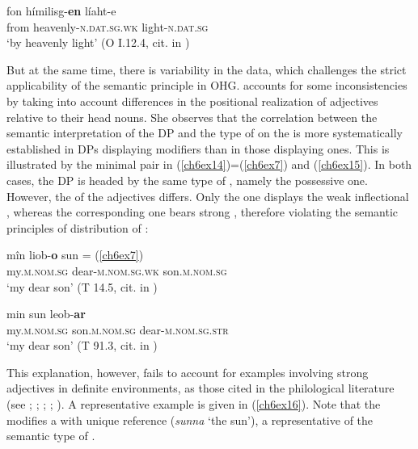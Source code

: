 \documentclass[output=paper,colorlinks,citecolor=brown]{langscibook}
\begin{document}
\begin{exe}
\ex\label{ch6ex13}
\gll fon hímilisg-\textbf{en} líaht-e\\
from heavenly-\textsc{n.dat.sg.wk} light-\textsc{n.dat.sg}\\
\glt `by heavenly light' (O I.12.4, cit. in \cite[67, ex. (45a)]{Demske01})
\end{exe}

But at the same time, there is variability in the data, which challenges
the strict applicability of the semantic principle in OHG. \citet[70]{Demske01} accounts for some inconsistencies by taking into account differences
in the positional realization of adjectives relative to their head
nouns. She observes that the correlation between the semantic
interpretation of the DP and the type of  on the  is
more systematically established in DPs displaying  modifiers
than in those displaying  ones. This is illustrated by the
minimal pair in (\ref{ch6ex14})=(\ref{ch6ex7}) and (\ref{ch6ex15}). In both cases, the DP is headed by
the same type of , namely the possessive one. However, the
 of the adjectives differs. Only the  one displays
the weak inflectional , whereas the corresponding  one
bears strong , therefore violating the semantic principles of
distribution of :

\begin{exe}
\ex\label{ch6ex14}
\gll mîn liob-\textbf{o} sun = (\ref{ch6ex7})\\
 my.\textsc{m.nom.sg} dear-\textsc{m.nom.sg.wk} son.\textsc{m.nom.sg}\\
\glt  `my dear son' (T 14.5, cit. in \cite[67, ex. (39a)]{Demske01})
\end{exe}

\begin{exe}
\ex\label{ch6ex15}
\gll min sun leob-\textbf{ar}\\
 my.\textsc{m.nom.sg} son.\textsc{m.nom.sg} dear-\textsc{m.nom.sg.str}\\
\glt  `my dear son' (T 91.3, cit. in \cite[67, ex. (46a)]{Demske01})
\end{exe}

This explanation, however, fails to account for examples involving
 strong adjectives in definite environments, as those cited in
the philological literature (see \citealp[750]{Wilmanns09}; \citealp[185]{behaghel1923deutsche};
\citealp[68--69]{Heinrichs54}; \citealp[68--70]{Dal14}; \citealp[298]{Braune2018AHD}). A
representative example is given in (\ref{ch6ex16}). Note that the 
modifies a  with unique reference (\emph{sunna} `the sun'), a
representative of the semantic type of .
\end{document}
